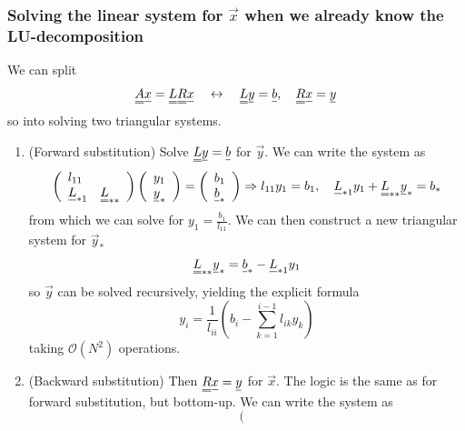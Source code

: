 \subsubsection{Solving the linear system for $\vec{x}$ when we already know the LU-decomposition}
We can split
\begin{equation}
    \mat{A} \vec{x} = \mat{L} \mat{R} \vec{x} \quad \leftrightarrow \quad \mat{L} \vec{y} = \vec{b}, \quad \mat{R} \vec{x} = \vec{y}
\end{equation}
so into solving two triangular systems.
\begin{enumerate}
    \item (\textcolor{blue1}{Forward substitution}) Solve $\mat{L} \vec{y} = \vec{b}$ for $\vec{y}$. We can write the system as
    \begin{equation}
        \left(\begin{array}{ll}
        l_{11} & \\
        \vec{L}_{* 1} & \mat{L}_{* *}
        \end{array}\right)\left(\begin{array}{l}
        y_1 \\
        \vec{y}_*
        \end{array}\right)=\left(\begin{array}{l}
        b_1 \\
        \vec{b}_*
        \end{array}\right) \Rightarrow l_{11} y_1=b_1, \quad \vec{L}_{* 1} y_1+\mat{L}_{* *} \vec{y}_*=b_*
    \end{equation}
    from which we can solve for $y_1 = \frac{b_1}{l_{11}}$. We can then construct a new triangular
    system for $\vec{y}_*$
    \begin{equation}
        \mat{L}_{* *} \vec{y}_* = \vec{b}_* - \vec{L}_{* 1} y_1
    \end{equation}
    so $\vec{y}$ can be solved recursively, yielding the explicit formula
    \begin{equation}
        y_i=\frac{1}{l_{i i}}\left(b_i-\sum_{k=1}^{i-1} l_{i k} y_k\right)
    \end{equation}
    taking $\mathcal{O}(N^2)$ operations.
    \item (\textcolor{blue1}{Backward substitution}) Then $\mat{R} \vec{x} = \vec{y}$ for $\vec{x}$. The logic is the same as for forward substitution, 
    but bottom-up. We can write the system as
    \begin{equation}
        \left(\begin{array}{ll}

\end{array}
\end{equation}
\end{enumerate}
